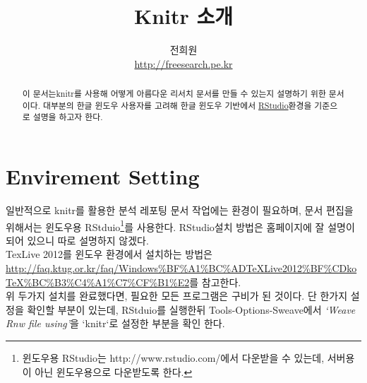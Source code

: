 \documentclass[11pt]{article}\usepackage{graphicx, color}
\title{Knitr 소개}
\author{전희원\\ \url{http://freesearch.pe.kr}}
\begin{document}
\maketitle

\tableofcontents

\begin{abstract}
이 문서는knitr\citep{knitr2012R}를 사용해 어떻게 아름다운 리서치 문서를 만들 수 있는지 설명하기 위한 문서이다. 대부분의 한글 윈도우 사용자를 고려해 한글 윈도우 기반에서 \href{http://www.rstudio.com/}{RStudio}환경을 기준으로 설명을 하고자 한다. 
\end{abstract}

\section{Envirement Setting \label{ss:envset}}
일반적으로 knitr를 활용한 분석 레포팅 문서 작업에는  환경이 필요하며, 문서 편집을 위해서는 윈도우용 RStduio\footnote{윈도우용 RStudio는 http://www.rstudio.com/에서 다운받을 수 있는데, 서버용이 아닌 윈도우용으로 다운받도록 한다.}를 사용한다. RStudio설치 방법은 홈페이지에 잘 설명이 되어 있으니 따로 설명하지 않겠다.
\\
TexLive 2012를 윈도우 환경에서 설치하는 방법은 \url{http://faq.ktug.or.kr/faq/Windows%BF%A1%BC%ADTeXLive2012%BF%CDkoTeX%BC%B3%C4%A1%C7%CF%B1%E2}를 참고한다. 
\\
위 두가지 설치를 완료했다면, 필요한 모든 프로그램은 구비가 된 것이다. 단 한가지 설정을 확인할 부분이 있는데, RStduio를 실행한뒤 Tools-Options-Sweave에서 \textit{`Weave Rnw file using'}을 `knitr`로 설정한 부분을 확인 한다. 

\begin{quotation}

\end{quotation}
\end{document}
